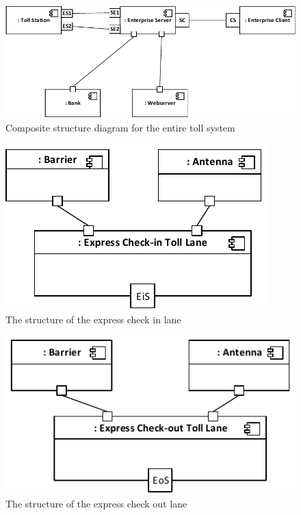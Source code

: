 \begin{figure}
\centerline{\includegraphics[width=\textwidth]{img/composite_structure_diagrams/cscd_enterprise}}
\caption{Composite structure diagram for the entire toll system}
\label{fig:csd_e}
\end{figure}

\begin{figure}
\centerline{\includegraphics[width=\textwidth]{img/composite_structure_diagrams/cscd_toll_lane_express_in}}
\caption{The structure of the express check in lane}
\label{fig:csd_tlei}
\end{figure}

\begin{figure}
\centerline{\includegraphics[width=\textwidth]{img/composite_structure_diagrams/cscd_toll_lane_express_out}}
\caption{The structure of the express check out lane}
\label{fig:csd_tleo}
\end{figure}

